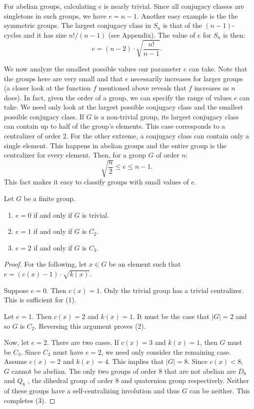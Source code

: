 \documentclass[main.tex]{subfiles}
\begin{document}
For abelian groups, calculating $e$ is nearly trivial. Since all conjugacy classes are singletons in such groups, we have $e = n - 1$. Another easy example is the the symmetric groups. The largest conjugacy class in $S_n$ is that of the $(n-1)$-cycles and it has size $n!/(n-1)$ (see Appendix). The value of $e$ for $S_n$ is then:
$$e = (n - 2) \cdot \sqrt{\frac{n!}{n-1}}\text{.}$$

\hss

We now analyze the smallest possible values our parameter $e$ can take. Note that the groups here are very small and that $e$ necessarily increases for larger groups (a closer look at the function $f$ mentioned above reveals that $f$ increases as $n$ does). In fact, given the order of a group, we can specify the range of values $e$ can take. We need only look at the largest possible conjugacy class and the smallest possible conjugacy class. If $G$ is a non-trivial group, its largest conjugacy class can contain up to half of the group's elements. This case corresponds to a centralizer of order 2. For the other extreme, a conjugacy class can contain only a single element. This happens in abelian groups and the entire group is the centralizer for every element. Then, for a group $G$ of order $n$:
\begin{equation}\label{erange}
\sqrt{\frac{n}{2}} \le e \le n - 1\text{.}
\end{equation}
This fact makes it easy to classify groups with small values of $e$.

\begin{theorem}\label{easycharacterization}
Let $G$ be a finite group.
\begin{enumerate}
	\item $e = 0$ if and only if $G$ is trivial.
	\item $e = 1$ if and only if $G$ is $C_2$.
	\item $e = 2$ if and only if $G$ is $C_3$.
\end{enumerate}
\end{theorem}

\begin{proof}
For the following, let $x \in G$ be an element such that $e = (c(x) - 1) \cdot \sqrt{k(x)}$.

Suppose $e = 0$. Then $c(x) = 1$. Only the trivial group has a trivial centralizer. This is sufficient for (1).

Let $e = 1$. Then $c(x) = 2$ and $k(x) = 1$. It must be the case that $|G| = 2$ and so $G$ is $C_2$. Reversing this argument proves (2).

Now, let $e = 2$. There are two cases. If $c(x) = 3$ and $k(x) = 1$, then $G$ must be $C_3$. Since $C_3$ must have $e = 2$, we need only consider the remaining case. Assume $c(x) = 2$ and $k(x) = 4$. This implies that $|G| = 8$. Since $c(x) < 8$, $G$ cannot be abelian. The only two groups of order 8 that are not abelian are $D_8$ and $Q_8$ \cite{smallgroups}, the dihedral group of order 8 and quaternion group respectively. Neither of these groups have a self-centralizing involution and thus $G$ can be neither. This completes (3).
\end{proof}
\end{document}
